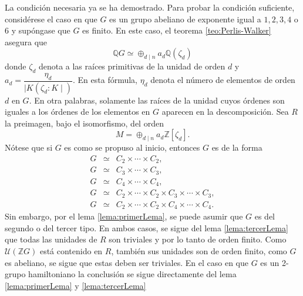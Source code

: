 \begin{proof*}
La condición necesaria ya se ha demostrado. Para probar la condición suficiente, considérese el caso en que $G$ es un grupo abeliano de exponente igual a $1,2,3,4$ o $6$ y supóngase que $G$ es finito. En este caso, el teorema \ref{teo:Perlis-Walker} asegura que \[ \mathds{Q}G \simeq \oplus_{d \mid n}a_d\mathds{Q}(\zeta_d)  \] donde $\zeta_d$ denota a las raíces primitivas de la unidad de orden $d$ y $a_d = \dfrac{\eta_d}{\mid K(\zeta_d : K \mid)}$. En esta fórmula, $\eta_d$ denota el número de elementos de orden $d$ en $G$. En otra palabras, solamente las raíces de la unidad cuyos órdenes son iguales a los órdenes de los elementos en $G$ aparecen en la descomposición.
Sea $R$ la preimagen, bajo el isomorfismo, del orden \[ M = \oplus_{d \mid n}a_d \mathds{Z}[\zeta_d].\] Nótese que si $G$ es como se propuso al inicio, entonces $G$ es de la forma 
\begin{eqnarray*}
G &\simeq& C_2 \times \cdots \times C_2, \\
G &\simeq& C_3 \times \cdots \times C_3, \\
G &\simeq& C_4 \times \cdots \times C_4,  \\
G &\simeq& C_2 \times \cdots \times C_2 \times C_3 \times \cdots \times C_3, \\
G &\simeq& C_2 \times \cdots \times C_2 \times C_4 \times \cdots \times C_4.
\end{eqnarray*}
Sin embargo, por el lema \ref{lema:primerLema}, se puede asumir que $G$ es del segundo o del tercer tipo. En ambos casos, se sigue del lema \ref{lema:tercerLema} que todas las unidades de $R$ son triviales y por lo tanto de orden finito. 
Como $\mathcal{U}(\mathds{Z}G)$ está contenido en $R$, también sus unidades son de orden finito, como $G$ es abeliano, se sigue que estas deben ser triviales.
En el caso en que $G$ es un 2-grupo hamiltoniano la conclusión se sigue directamente del lema \ref{lema:primerLema} y \ref{lema:tercerLema}
\end{proof*}
